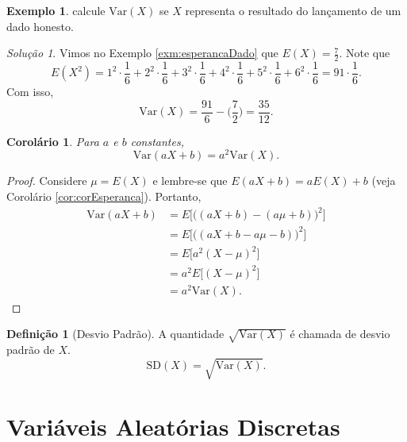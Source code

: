 \documentclass[]{book}
\newtheorem{corollary}{Corolário}[chapter]
\theoremstyle{definition}
\newtheorem{definition}{Definição}[chapter]
\theoremstyle{definition}
\newtheorem{example}{Exemplo}[chapter]
\theoremstyle{definition}
\theoremstyle{remark}
\newtheorem*{solution}{Solução}
\begin{document}
\begin{example}
\protect\hypertarget{exm:unnamed-chunk-146}{}{\label{exm:unnamed-chunk-146} }calcule \(\mathrm{Var}(X)\) se \(X\) representa o resultado do lançamento de um dado honesto.
\end{example}

\begin{solution}
\iffalse{} {Solução. } \fi{}Vimos no Exemplo \ref{exm:esperancaDado} que \(E(X) =\frac{7}{2}\).
Note que
\[E(X^2) = 1^2\cdot \frac{1}{6} +2^2\cdot \frac{1}{6}+3^2\cdot \frac{1}{6}+4^2\cdot \frac{1}{6}+5^2\cdot \frac{1}{6}+6^2\cdot \frac{1}{6}=91\cdot\frac{1}{6}.\]
Com isso,
\[\mathrm{Var}(X) = \frac{91}{6} - \bigg(\frac{7}{2}\bigg) = \frac{35}{12}.\]
\end{solution}

\begin{corollary}
\protect\hypertarget{cor:unnamed-chunk-148}{}{\label{cor:unnamed-chunk-148} }Para \(a\) e \(b\) constantes, \[\mathrm{Var}(aX+b) = a^2\mathrm{Var}(X).\]
\end{corollary}

\begin{proof}
\iffalse{} {Prova. } \fi{}Considere \(\mu=E(X)\) e lembre-se que \(E(aX+b)=aE(X)+b\) (veja Corolário \ref{cor:corEsperanca}).
Portanto,
\begin{align}
\mathrm{Var}(aX+b) &= E\bigg[\big((aX+b)-(a\mu+b)\big)^2\bigg] \\
&= E\bigg[\big((aX+b-a\mu-b)\big)^2\bigg] \\
&= E\big[a^2(X-\mu)^2\big] \\
&= a^2 E\big[(X-\mu)^2\big] \\
&= a^2 \mathrm{Var}(X).
\end{align}
\end{proof}

\begin{definition}[Desvio Padrão]
\protect\hypertarget{def:unnamed-chunk-150}{}{\label{def:unnamed-chunk-150} \iffalse (Desvio Padrão) \fi{} }A quantidade \(\sqrt{\mathrm{Var}(X)}\) é chamada de desvio padrão de \(X\).
\[\mathrm{SD}(X) = \sqrt{\mathrm{Var}(X)}.\]
\end{definition}

\hypertarget{variuxe1veis-aleatuxf3rias-discretas}{%
\section{Variáveis Aleatórias Discretas}\label{variuxe1veis-aleatuxf3rias-discretas}}
\end{document}
